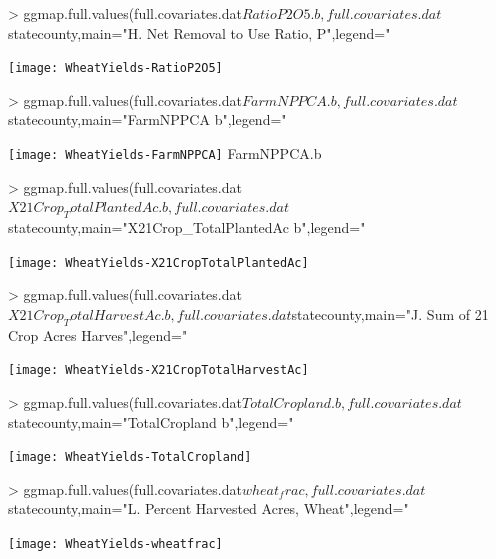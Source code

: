 \documentclass{report}
\begin{document}
\begin{Schunk}
\begin{Sinput}
> ggmap.full.values(full.covariates.dat$RatioP2O5.b,full.covariates.dat$statecounty,main="H. Net Removal to Use Ratio, P",legend="%
\end{Sinput}
\end{Schunk}
\texttt{[image: WheatYields-RatioP2O5]}

\begin{Schunk}
\begin{Sinput}
> ggmap.full.values(full.covariates.dat$FarmNPPCA.b,full.covariates.dat$statecounty,main="FarmNPPCA b",legend="%
\end{Sinput}
\end{Schunk}
\texttt{[image: WheatYields-FarmNPPCA]}
FarmNPPCA.b

\begin{Schunk}
\begin{Sinput}
> ggmap.full.values(full.covariates.dat$X21Crop_TotalPlantedAc.b,full.covariates.dat$statecounty,main="X21Crop_TotalPlantedAc b",legend="%
\end{Sinput}
\end{Schunk}
\texttt{[image: WheatYields-X21CropTotalPlantedAc]}

\begin{Schunk}
\begin{Sinput}
> ggmap.full.values(full.covariates.dat$X21Crop_TotalHarvestAc.b,full.covariates.dat$statecounty,main="J. Sum of 21 Crop Acres Harves",legend="%
\end{Sinput}
\end{Schunk}
\texttt{[image: WheatYields-X21CropTotalHarvestAc]}

\begin{Schunk}
\begin{Sinput}
> ggmap.full.values(full.covariates.dat$TotalCropland.b,full.covariates.dat$statecounty,main="TotalCropland b",legend="%
\end{Sinput}
\end{Schunk}
\texttt{[image: WheatYields-TotalCropland]}

\begin{Schunk}
\begin{Sinput}
> ggmap.full.values(full.covariates.dat$wheat_frac,full.covariates.dat$statecounty,main="L. Percent Harvested Acres, Wheat",legend="%
\end{Sinput}
\end{Schunk}
\texttt{[image: WheatYields-wheatfrac]}
\end{document}

